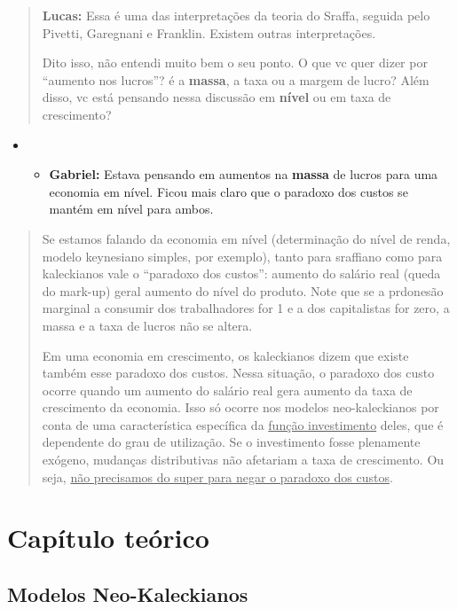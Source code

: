 \documentclass[]{article}
\begin{document}
\begin{quote}
    \textbf{Lucas:} Essa é uma das interpretações da teoria do Sraffa, seguida pelo Pivetti, Garegnani e Franklin. Existem outras interpretações. 
    
Dito isso, não entendi muito bem o seu ponto. O que vc quer dizer por “aumento nos lucros”? é a \textbf{massa}, a taxa ou a margem de lucro? Além disso, vc está pensando nessa discussão em \textbf{nível} ou em taxa de crescimento?
\end{quote}

\begin{itemize}
 \item[]
    \begin{itemize}
        \item[] \textbf{Gabriel:} Estava pensando em aumentos na \textbf{massa} de lucros para uma economia em nível. Ficou mais claro que o paradoxo dos custos se mantém em nível para ambos. 
    \end{itemize}
\end{itemize}

\begin{quote}
Se estamos falando da economia em nível (determinação do nível de renda, modelo keynesiano simples, por exemplo), tanto para sraffiano como para kaleckianos vale o “paradoxo dos custos”: aumento do salário real (queda do mark-up) geral aumento do nível do produto. Note que se a prdonesão marginal a consumir dos trabalhadores for 1 e a dos capitalistas for zero, a massa e a taxa de lucros não se altera. 

Em uma economia em crescimento, os kaleckianos dizem que existe também esse paradoxo dos custos. Nessa situação, o paradoxo dos custo ocorre quando um aumento do salário real gera aumento da taxa de crescimento da economia. Isso só ocorre nos modelos neo-kaleckianos por conta de uma característica específica da \underline{função investimento} deles, que é dependente do grau de utilização. Se o investimento fosse plenamente exógeno, mudanças distributivas não afetariam a taxa de crescimento. Ou seja, \underline{não precisamos do super para negar o paradoxo dos custos}. 
\end{quote}

\section{Capítulo teórico}\label{capitulo-teorico}

\subsection{Modelos Neo-Kaleckianos}\label{modelos-neo-kaleckianos}
\end{document}
